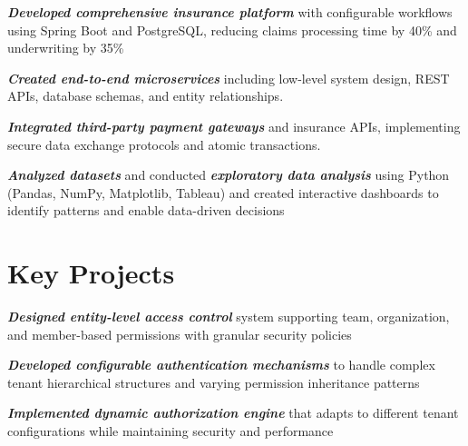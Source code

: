 \documentclass[]{deedy-resume-reversed}
\begin{document}
\begin{minipage}[t]{0.66\textwidth}
\begin{tightemize}
\item \textbf{\emph{Developed comprehensive insurance platform}} with configurable workflows using Spring Boot and PostgreSQL, reducing claims processing time by 40\% and underwriting by 35\%
\item \textbf{\emph{Created end-to-end microservices}} including low-level system design, REST APIs, database schemas, and entity relationships.
\item \textbf{\emph{Integrated third-party payment gateways}} and insurance APIs, implementing secure data exchange protocols and atomic transactions.
\end{tightemize}
\sectionsep

 \hfill {}


\begin{tightemize}
\item \textbf{\emph{Analyzed datasets}} and conducted \textbf{\emph{exploratory data analysis}} using Python (Pandas, NumPy, Matplotlib, Tableau) and created interactive dashboards to identify patterns and enable data-driven decisions
\end{tightemize}
\sectionsep


\section{Key Projects}
\begin{tightemize}
\item \textbf{\emph{Designed entity-level access control}} system supporting team, organization, and member-based permissions with granular security policies
\item \textbf{\emph{Developed configurable authentication mechanisms}} to handle complex tenant hierarchical structures and varying permission inheritance patterns
\item \textbf{\emph{Implemented dynamic authorization engine}} that adapts to different tenant configurations while maintaining security and performance
\end{tightemize}
\sectionsep


\end{minipage}
\end{document}
